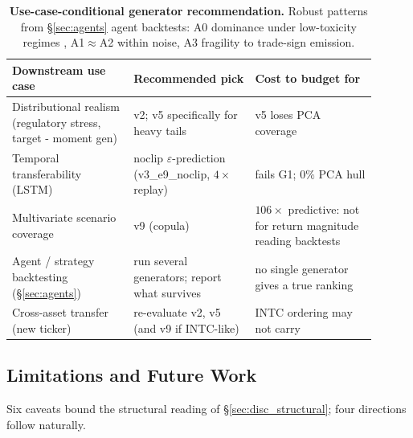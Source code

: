 \documentclass[journal]{IEEEtran}
\newcommand{\eps}{\varepsilon}
\theoremstyle{definition}   %
\begin{document}
\begin{table}[ht]
    \centering
    \footnotesize
    \begin{tabular}{p{0.30\linewidth} p{0.30\linewidth} p{0.30\linewidth}}
        \toprule
        Downstream use case & Recommended pick & Cost to budget for \\
        \midrule
        Distributional realism (regulatory stress, target - moment gen) & v2; v5 specifically for heavy tails & v5 loses PCA coverage \\
        Temporal transferability (LSTM) & noclip $\eps$-prediction (v3\_e9\_noclip, $4\times$ replay) & fails G1; $0\%$ PCA hull \\
        Multivariate scenario coverage & v9 (copula) & $106\times$ predictive: not for return magnitude reading backtests \\
        Agent / strategy backtesting (\S\ref{sec:agents}) & run several generators; report what survives & no single generator gives a true ranking \\
        Cross-asset transfer (new ticker) & re-evaluate v2, v5 (and v9 if INTC-like) & INTC ordering may not carry \\
        \bottomrule
    \end{tabular}
    \caption{\textbf{Use-case-conditional generator recommendation.}
    Robust patterns from \S\ref{sec:agents} agent backtests: A0
    dominance under low-toxicity regimes
    \cite{avellaneda2008high}, A1$\approx$A2 within noise, A3
    fragility to trade-sign emission.}
    \label{tab:disc_use_cases}
\end{table}

\subsection{Limitations and Future Work}
\label{sec:limitations}

Six caveats bound the structural reading of
\S\ref{sec:disc_structural}; four directions follow naturally.
\end{document}
